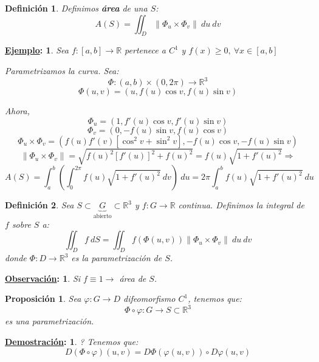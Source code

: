 \documentclass[10pt,a4paper,openright]{book}
\theoremstyle{break}
\newtheorem*{defi}{Definición}
\newtheorem*{prop}{Proposición}
\newtheorem*{demo}{\underline{Demostración}:}
\newtheorem*{obs}{\underline{Observación}:}
\newtheorem*{ej}{\underline{Ejemplo}:}
\newcommand{\dif}[1]{\ d#1}
\begin{document}
\begin{defi}
Definimos \textbf{área} de una $S$: 
$$A\left( S \right) = \iint_{D} \lVert \Phi_{u} \times \Phi_v \rVert \dif{u} \dif{v}$$
\end{defi}

\begin{ej}
Sea $f: \left[ a, b \right] \rightarrow \mathbb{R}$ pertenece a $C^1$ y $f\left( x \right) \ge 0,\ \forall x \in \left[ a, b \right]$

Parametrizamos la curva. Sea:
$$\Phi: \left( a, b \right) \times \left( 0, 2\pi \right) \rightarrow \mathbb{R}^3$$
$$\Phi \left( u, v \right) = \left( u, f\left( u \right)\cos v, f\left( u \right)\sin v \right) $$

Ahora, 
$$\Phi_u = \left( 1, f'\left( u \right) \cos v, f'\left( u \right) \sin v \right)$$
$$\Phi_v = \left( 0, -f\left( u \right) \sin v, f\left( u \right) \cos v \right)$$
$$\Phi_u \times \Phi_v = \left( f\left( u \right) f'\left( v \right) \left[ \cos^2 v + \sin^2 v \right], -f\left( u \right) \cos v, -f\left( u \right) \sin v \right)$$
$$\lVert \Phi_u \times \Phi_v \rVert = \sqrt{f\left( u \right)^2 \left[ f'\left( u \right) \right]^2 + f\left( u \right)^2} = f\left( u \right) \sqrt{1 + f'\left( u \right)^2} \Rightarrow$$
$$A\left( S \right) = \int_{a}^{b} \left( \int_{0}^{2\pi} f\left( u \right) \sqrt{1 + f'\left( u \right)^2} \dif{v} \right) \dif{u} = 2\pi \int_{a}^{b} f\left( u \right) \sqrt{1 + f'\left( u \right)^2} \dif{u} $$
\end{ej}

\begin{defi}
Sea $S \subset \underbrace{G}_{\text{abierto}} \subset \mathbb{R}^3$ y $f: G \rightarrow \mathbb{R}$ continua. Definimos la integral de $f$ sobre $S$ a: 
$$\iint_{D} f \dif{S} = \iint_{D} f\left( \Phi\left( u, v \right) \right) \lVert \Phi_u \times \Phi_v \rVert \dif{u} \dif{v}$$
donde $\Phi: D \rightarrow \mathbb{R}^3$ es la parametrización de $S$.
\end{defi}
\begin{obs}
Si $f \equiv 1 \rightarrow$ área de $S$.
\end{obs}

\begin{prop}
Sea $\varphi: G \rightarrow D$ difeomorfismo $C^1$, tenemos que: 
$$\Phi \circ \varphi: G \rightarrow S \subset \mathbb{R}^3$$
es una parametrización.
\end{prop}
\begin{demo}?
Tenemos que: 
$$D\left( \Phi \circ \varphi \right) \left( u, v \right) = D\Phi\left( \varphi\left( u, v \right) \right) \circ D\varphi\left( u, v \right)$$
\end{demo}
\end{document}
